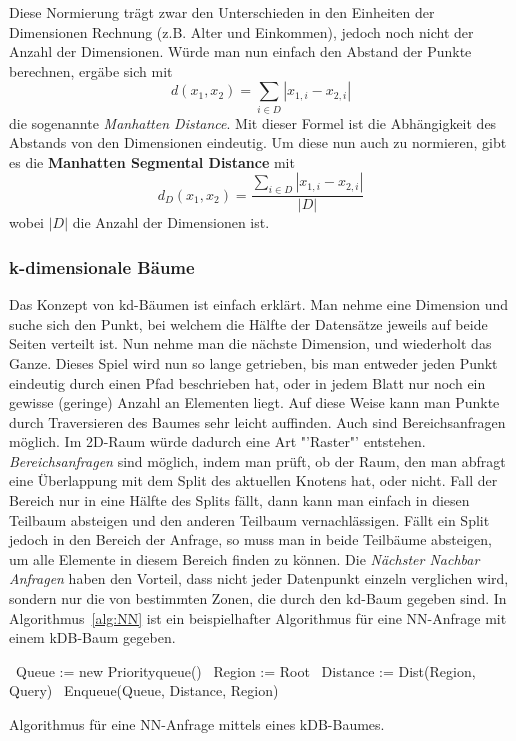 Diese Normierung trägt zwar den Unterschieden in den Einheiten der Dimensionen
Rechnung (z.B. Alter und Einkommen), jedoch noch nicht der Anzahl der Dimensionen.
Würde man nun einfach den Abstand der Punkte berechnen, ergäbe sich mit
\[
	d(x_1, x_2) = \sum\limits_{i\in D} |x_{1,i} - x_{2,i}|
\]
die sogenannte \textit{Manhatten Distance}. Mit dieser Formel ist die Abhängigkeit
des Abstands von den Dimensionen eindeutig. Um diese nun auch zu normieren, gibt
es die \textbf{Manhatten Segmental Distance} mit
\[
	d_D(x_1, x_2) = \frac{\sum\limits_{i\in D} |x_{1,i} - x_{2,i}|}{|D|}
\]
wobei \(|D|\) die Anzahl der Dimensionen ist.

\subsubsection{k-dimensionale Bäume}
Das Konzept von kd-Bäumen ist einfach erklärt. Man nehme eine Dimension und suche
sich den Punkt, bei welchem die Hälfte der Datensätze jeweils auf beide Seiten
verteilt ist. Nun nehme man die nächste Dimension, und wiederholt das Ganze. Dieses
Spiel wird nun so lange getrieben, bis man entweder jeden Punkt eindeutig durch
einen Pfad beschrieben hat, oder in jedem Blatt nur noch ein gewisse (geringe) 
Anzahl an Elementen liegt. Auf diese Weise kann man Punkte durch Traversieren
des Baumes sehr leicht auffinden. Auch sind Bereichsanfragen möglich. 
Im 2D-Raum würde dadurch eine Art "'Raster"' entstehen.
\textit{Bereichsanfragen} sind möglich, indem man prüft, ob der Raum, den man abfragt
eine Überlappung mit dem Split des aktuellen Knotens hat, oder nicht. Fall
der Bereich nur in eine Hälfte des Splits fällt, dann kann man einfach in diesen Teilbaum
absteigen und den anderen Teilbaum vernachlässigen. Fällt ein Split jedoch
in den Bereich der Anfrage, so muss man in beide Teilbäume absteigen, um alle
Elemente in diesem Bereich finden zu können.
Die \textit{Nächster Nachbar Anfragen} haben den Vorteil, dass nicht jeder Datenpunkt
einzeln verglichen wird, sondern nur die von bestimmten Zonen, die durch den
kd-Baum gegeben sind. In Algorithmus~\ref{alg:NN} ist ein beispielhafter Algorithmus
für eine NN-Anfrage mit einem kDB-Baum gegeben.

\begin{algorithm}[htb]
	\SetAlgoLined
	\DontPrintSemicolon
	\BlankLine
	\BlankLine
	\ {Queue := new Priorityqueue()}\;
	\ {Region := Root}\;
	\ {Distance := Dist(Region, Query)}\;
	\ {Enqueue(Queue, Distance, Region)}\;
	\BlankLine
	\BlankLine
	\caption{Algorithmus für eine NN-Anfrage mittels eines kDB-Baumes.\label{alg:NN}}
\end{algorithm}



